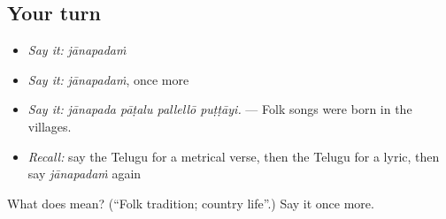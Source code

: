 \subsection*{Your turn}
\begin{itemize}
\raggedright
  \item \emph{Say it:} \emph{jānapadaṁ}
  \item \emph{Say it:} \emph{jānapadaṁ}, once more
  \item \emph{Say it:} \emph{jānapada pāṭalu pallellō puṭṭāyi.} — Folk songs were born in the villages.
  \item \emph{Recall:} say the Telugu for a metrical verse, then the Telugu for a lyric, then say \emph{jānapadaṁ} again
\end{itemize}

\begin{tcolorbox}[breakable,colback=teal!4,colframe=teal!35!black,title={Before you move on}]
What does  mean? (\textquotedblleft{}Folk tradition; country life\textquotedblright{}.) Say it once more.
\end{tcolorbox}
